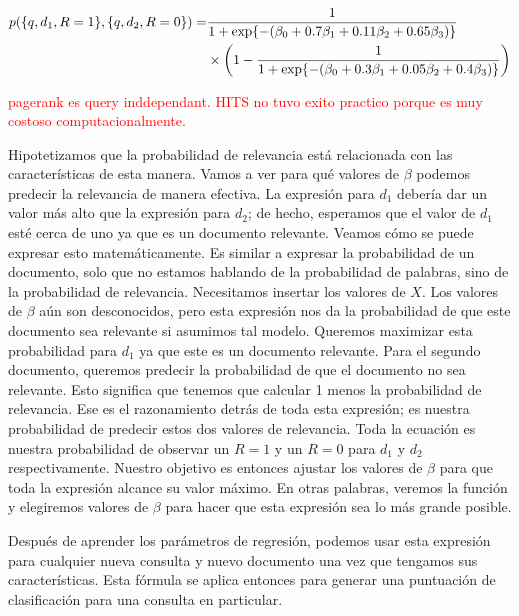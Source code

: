 \begin{align}
p(\{q, d_1, R = 1\}, \{q, d_2, R = 0\}) =& \frac{1}{1 + \exp\{-(\beta_0 + 0.7\beta_1 + 0.11\beta_2 + 0.65\beta_3)\}} \notag \\
& \times \left(1 - \frac{1}{1 + \exp\{-(\beta_0 + 0.3\beta_1 + 0.05\beta_2 + 0.4\beta_3)\}}\right)
\end{align}

\textcolor{red}{pagerank es query inddependant. HITS no tuvo exito practico porque es muy costoso computacionalmente.}


Hipotetizamos que la probabilidad de relevancia está relacionada con las características de esta manera. Vamos a ver para qué valores de $\beta$ podemos predecir la relevancia de manera efectiva. La expresión para $d_1$ debería dar un valor más alto que la expresión para $d_2$; de hecho, esperamos que el valor de $d_1$ esté cerca de uno ya que es un documento relevante. Veamos cómo se puede expresar esto matemáticamente. Es similar a expresar la probabilidad de un documento, solo que no estamos hablando de la probabilidad de palabras, sino de la probabilidad de relevancia. Necesitamos insertar los valores de $X$. Los valores de $\beta$ aún son desconocidos, pero esta expresión nos da la probabilidad de que este documento sea relevante si asumimos tal modelo. Queremos maximizar esta probabilidad para $d_1$ ya que este es un documento relevante. Para el segundo documento, queremos predecir la probabilidad de que el documento no sea relevante. Esto significa que tenemos que calcular 1 menos la probabilidad de relevancia. Ese es el razonamiento detrás de toda esta expresión; es nuestra probabilidad de predecir estos dos valores de relevancia. Toda la ecuación es nuestra probabilidad de observar un $R = 1$ y un $R = 0$ para $d_1$ y $d_2$ respectivamente. Nuestro objetivo es entonces ajustar los valores de $\beta$ para que toda la expresión alcance su valor máximo. En otras palabras, veremos la función y elegiremos valores de $\beta$ para hacer que esta expresión sea lo más grande posible.

Después de aprender los parámetros de regresión, podemos usar esta expresión para cualquier nueva consulta y nuevo documento una vez que tengamos sus características. Esta fórmula se aplica entonces para generar una puntuación de clasificación para una consulta en particular.

